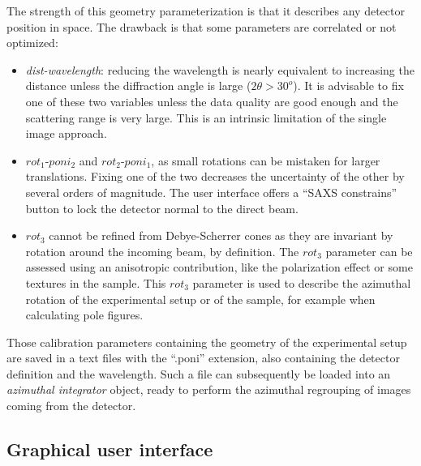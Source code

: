 \documentclass[preprint]{iucr}              %
\begin{document}


The strength of this geometry parameterization is that it describes any detector position in
space. 
The drawback is that some parameters are correlated or not optimized:

\begin{itemize}
  \item \textit{dist-wavelength}: reducing the wavelength is nearly equivalent
  to increasing the distance unless the diffraction angle is 
  large ($2\theta>30^o$). 
  It is advisable to fix one of these two variables unless the data quality are good enough
  and the scattering range is very large. 
  This is an intrinsic limitation of the single image approach.
  \item $rot_1$-$poni_2$ and $rot_2$-$poni_1$, as small rotations can be
  mistaken for larger translations. 
  Fixing one of the two decreases the uncertainty of the other by several orders of
  magnitude. 
  The user interface offers a ``SAXS constrains'' button to lock the detector normal to the direct beam.
  \item $rot_3$ cannot be refined from Debye-Scherrer cones as they are
  invariant by rotation around the incoming beam, by definition. 
  The $rot_3$ parameter can be
  assessed using an anisotropic contribution, like the polarization effect or
  some  textures in the sample.
  This $rot_3$ parameter is used to describe the azimuthal rotation of
  the experimental setup or of the sample, for example when calculating pole
  figures.
\end{itemize}
 
Those calibration parameters containing the geometry of the experimental setup 
are saved in a text files with the ``.poni'' extension, 
also containing the detector definition and the wavelength.
Such a file can subsequently be loaded into an \textit{azimuthal integrator}
object, ready to perform the azimuthal regrouping of images coming from the detector.

\subsection{Graphical user interface}
\end{document}
